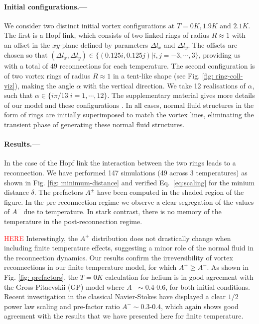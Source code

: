 \documentclass[%
 reprint,
 amsmath,amssymb,
 aps,
 prl,
]{revtex4-2}
\def\red#1{\textcolor{red}{#1}}
\begin{document}
\paragraph*{Initial configurations.---}
We consider two distinct initial vortex configurations
at $T=0K,1.9K$ and $2.1K$. The first is a Hopf link, which consists
of two linked rings of radius $R\approx1$ with an offset in the $xy$-plane 
defined by parameters $\Delta l_x$ and $\Delta l_y$. 
The offsets are chosen so that 
$(\Delta l_x, \Delta l _y) \in \lbrace(0.125i,0.125j)|i,j=-3,\cdots,3 \rbrace$,
providing us with a total of 49 reconnections for each temperature. 
The second configuration is of two vortex rings of radius $R\approx1$ 
in a tent-like shape (see Fig. \ref{fig: ring-coll-viz}), 
making the angle $\alpha$ with the vertical direction. 
We take 12 realisations of $\alpha$, such that 
$\alpha\in\lbrace i\pi/13|i=1,\cdots,12\rbrace$. The supplementary material 
gives more details of our model and these configurations
\cite{SeeSupplementaryMaterials}. In all cases, normal fluid structures
in the form of rings are 
initially superimposed to match the vortex lines, eliminating the transient 
phase of generating these normal fluid structures.


\paragraph*{Results.---}
In the case of the Hopf link the interaction between the two rings leads
to a reconnection.  We have performed 147 simulations 
(49 across 3 temperatures) as shown in Fig. \ref{fig: minimum-distance} and
verified Eq.~\ref{eq:scaling} for the minium distance $\delta$. 
The prefactors $A^{\pm}$ have been computed in the shaded region 
of the figure. In the pre-reconnection regime we observe
a clear segregation of the values of $A^-$ due to temperature. 
In stark contrast, there is no memory of the temperature in the
post-reconnection regime. 

\red{HERE}
Interestingly, the $A^{+}$ distribution does not drastically change when including finite temperature effects, suggesting a minor role of the normal fluid in the reconnection dynamics. Our results confirm the irreversibility of vortex reconnections in our finite temperature model, for which $A^{+}\geq A^{-}$. As shown in Fig. \ref{fig: prefactors}, the $T=0K$ calculation for helium is in good agreement with the Gross-Pitaevskii (GP) model where $A^-\sim0.4$-$0.6$, for both initial conditions. Recent investigation in the classical Navier-Stokes \cite{yaoSeparationScalingViscous2020} have displayed a clear $1/2$ power law scaling and pre-factor ratio $A^-\sim0.3$-$0.4$, which again shows good agreement with the results that we have presented here for finite temperature. 
\end{document}
